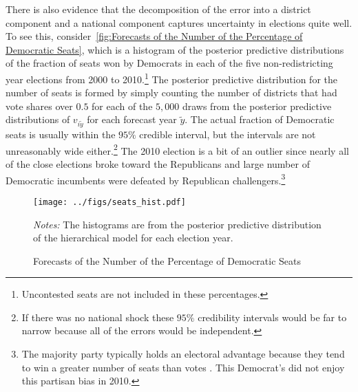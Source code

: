 \documentclass[12pt,final,fleqn]{article}
\theoremstyle{plain}
\begin{document}
There is also evidence that the decomposition of the error into a district component and a national component captures uncertainty in elections quite well. To see this, consider~\autoref{fig:Forecasts of the Number of the Percentage of Democratic Seats}, which is a histogram of the posterior predictive distributions of the fraction of seats won by Democrats in each of the five non-redistricting year elections from 2000 to 2010.\footnote{Uncontested seats are not included in these percentages.} The posterior predictive distribution for the number of seats is formed by simply counting the number of districts that had vote shares over $0.5$ for each of the $5,000$ draws from the posterior predictive distributions of $v_{i\tilde{y}}$ for each forecast year $\tilde{y}$. The actual fraction of Democratic seats is usually within the $95\%$ credible interval, but the intervals are not unreasonably wide either.\footnote{If there was no national shock these $95\%$ credibility intervals would be far to narrow because all of the errors would be independent.} The 2010 election is a bit of an outlier since nearly all of the close elections broke toward the Republicans and large number of Democratic incumbents were defeated by Republican challengers.\footnote{The majority party typically holds an electoral advantage because they tend to win a greater number of seats than votes \citep{tufte1973relationship}. This Democrat's did not enjoy this partisan bias in 2010.} 

\begin{figure}[!htb]
\centering
\texttt{[image: ../figs/seats\_hist.pdf]}
\vspace{.5cm}
\caption{Forecasts of the Number of the Percentage of Democratic Seats}
\label{fig:Forecasts of the Number of the Percentage of Democratic Seats}
\begin{minipage}{\linewidth}
\footnotesize
\emph{Notes:} The histograms are from the posterior predictive distribution of the hierarchical model for each election year.
\end{minipage}
\end{figure}
\end{document}
